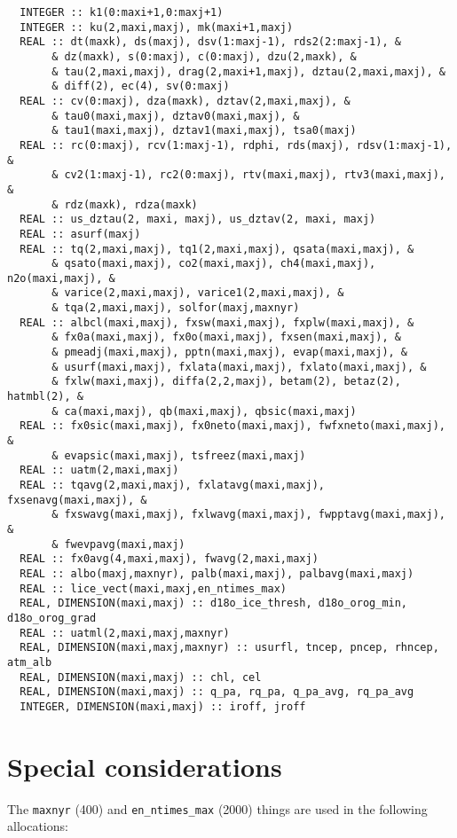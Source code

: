 \documentclass[a4paper,10pt,article]{memoir}
\begin{document}
\begin{verbatim}
  INTEGER :: k1(0:maxi+1,0:maxj+1)
  INTEGER :: ku(2,maxi,maxj), mk(maxi+1,maxj)
  REAL :: dt(maxk), ds(maxj), dsv(1:maxj-1), rds2(2:maxj-1), &
       & dz(maxk), s(0:maxj), c(0:maxj), dzu(2,maxk), &
       & tau(2,maxi,maxj), drag(2,maxi+1,maxj), dztau(2,maxi,maxj), &
       & diff(2), ec(4), sv(0:maxj)
  REAL :: cv(0:maxj), dza(maxk), dztav(2,maxi,maxj), &
       & tau0(maxi,maxj), dztav0(maxi,maxj), &
       & tau1(maxi,maxj), dztav1(maxi,maxj), tsa0(maxj)
  REAL :: rc(0:maxj), rcv(1:maxj-1), rdphi, rds(maxj), rdsv(1:maxj-1), &
       & cv2(1:maxj-1), rc2(0:maxj), rtv(maxi,maxj), rtv3(maxi,maxj), &
       & rdz(maxk), rdza(maxk)
  REAL :: us_dztau(2, maxi, maxj), us_dztav(2, maxi, maxj)
  REAL :: asurf(maxj)
  REAL :: tq(2,maxi,maxj), tq1(2,maxi,maxj), qsata(maxi,maxj), &
       & qsato(maxi,maxj), co2(maxi,maxj), ch4(maxi,maxj), n2o(maxi,maxj), &
       & varice(2,maxi,maxj), varice1(2,maxi,maxj), &
       & tqa(2,maxi,maxj), solfor(maxj,maxnyr)
  REAL :: albcl(maxi,maxj), fxsw(maxi,maxj), fxplw(maxi,maxj), &
       & fx0a(maxi,maxj), fx0o(maxi,maxj), fxsen(maxi,maxj), &
       & pmeadj(maxi,maxj), pptn(maxi,maxj), evap(maxi,maxj), &
       & usurf(maxi,maxj), fxlata(maxi,maxj), fxlato(maxi,maxj), &
       & fxlw(maxi,maxj), diffa(2,2,maxj), betam(2), betaz(2), hatmbl(2), &
       & ca(maxi,maxj), qb(maxi,maxj), qbsic(maxi,maxj)
  REAL :: fx0sic(maxi,maxj), fx0neto(maxi,maxj), fwfxneto(maxi,maxj), &
       & evapsic(maxi,maxj), tsfreez(maxi,maxj)
  REAL :: uatm(2,maxi,maxj)
  REAL :: tqavg(2,maxi,maxj), fxlatavg(maxi,maxj), fxsenavg(maxi,maxj), &
       & fxswavg(maxi,maxj), fxlwavg(maxi,maxj), fwpptavg(maxi,maxj), &
       & fwevpavg(maxi,maxj)
  REAL :: fx0avg(4,maxi,maxj), fwavg(2,maxi,maxj)
  REAL :: albo(maxj,maxnyr), palb(maxi,maxj), palbavg(maxi,maxj)
  REAL :: lice_vect(maxi,maxj,en_ntimes_max)
  REAL, DIMENSION(maxi,maxj) :: d18o_ice_thresh, d18o_orog_min, d18o_orog_grad
  REAL :: uatml(2,maxi,maxj,maxnyr)
  REAL, DIMENSION(maxi,maxj,maxnyr) :: usurfl, tncep, pncep, rhncep, atm_alb
  REAL, DIMENSION(maxi,maxj) :: chl, cel
  REAL, DIMENSION(maxi,maxj) :: q_pa, rq_pa, q_pa_avg, rq_pa_avg
  INTEGER, DIMENSION(maxi,maxj) :: iroff, jroff
\end{verbatim}

\section{Special considerations}

The \texttt{maxnyr} (400) and \texttt{en\_ntimes\_max} (2000) things
are used in the following allocations:
\end{document}

